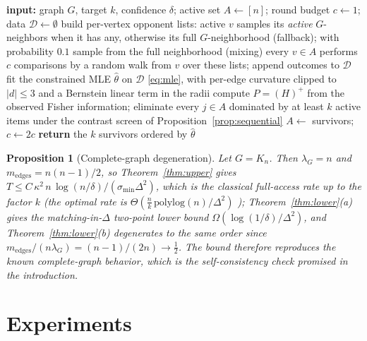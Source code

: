 \documentclass[11pt]{article}
\newtheorem{proposition}[theorem]{Proposition}
\theoremstyle{definition}
\newcommand{\lG}{\lambda_G}
\begin{document}
\begin{algorithm}[t]
\caption{\textsc{GraphWalk-SE} (practical variant evaluated in Section~\ref{sec:exp})}
\label{alg:gwe}
\begin{algorithmic}[1]
\State \textbf{input:} graph $G$, target $k$, confidence $\delta$; active set $A\gets[n]$; round budget $c\gets1$; data $\mathcal D\gets\emptyset$
\State build per-vertex opponent lists: active $v$ samples its \emph{active} $G$-neighbors when it has any, otherwise its full $G$-neighborhood (fallback); with probability $0.1$ sample from the full neighborhood (mixing)
\State every $v\in A$ performs $c$ comparisons by a random walk from $v$ over these lists; append outcomes to $\mathcal D$
\State fit the constrained MLE $\hat\theta$ on $\mathcal D$ \eqref{eq:mle}, with per-edge curvature clipped to $|d|\le 3$ and a Bernstein linear term in the radii
\State compute $P=(H)^{+}$ from the observed Fisher information; eliminate every $j\in A$ dominated by at least $k$ active items under the contrast screen of Proposition~\ref{prop:sequential}
\State $A\gets$ survivors; $c\gets 2c$
\EndWhile
\State \textbf{return} the $k$ survivors ordered by $\hat\theta$
\end{algorithmic}
\end{algorithm}

\begin{proposition}[Complete-graph degeneration]
\label{prop:complete}
Let $G=K_n$.  Then $\lG=n$ and $m_{\mathrm{edges}}=n(n-1)/2$, so Theorem~\ref{thm:upper} gives
$T\le C\,\kappa^2\, n\,\log(n/\delta)/(\sigma_{\min}\Delta^2)$,
which is the classical full-access rate up to the factor $k$ (the optimal rate is $\Theta(\frac nk\,\mathrm{polylog}(n)/\Delta^2)$ \cite{shah2015simple,heckel2018approximate,chen2017spectral,goldberger2026optimal}); Theorem~\ref{thm:lower}(a) gives the matching-in-$\Delta$ two-point lower bound $\Omega(\log(1/\delta)/\Delta^2)$, and Theorem~\ref{thm:lower}(b) degenerates to the same order since $m_{\mathrm{edges}}/(n\lG)=(n-1)/(2n)\to\tfrac12$.  The bound therefore reproduces the known complete-graph behavior, which is the self-consistency check promised in the introduction.
\end{proposition}

\section{Experiments}
\label{sec:exp}
\end{document}
